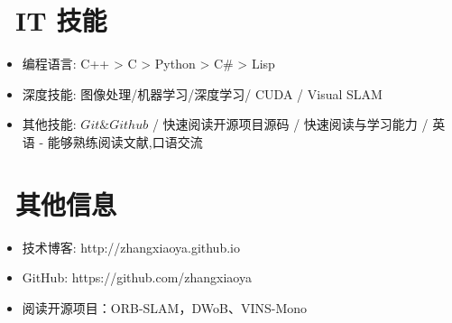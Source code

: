 \documentclass{resume}
\begin{document}

\section{\faCogs\ IT 技能}
\begin{itemize}[parsep=0.5ex]
  \item 编程语言: C++ > C > Python > C\# > Lisp
  \item 深度技能: 图像处理/机器学习/深度学习/ CUDA / Visual SLAM
  \item 其他技能: $Git\& Github$ / 快速阅读开源项目源码  / 快速阅读与学习能力 / 英语 - 能够熟练阅读文献,口语交流
\end{itemize}

\section{\faInfo\ 其他信息}
\begin{itemize}[parsep=0.5ex]
  \item 技术博客: http://zhangxiaoya.github.io
  \item GitHub: https://github.com/zhangxiaoya
  \item 阅读开源项目：ORB-SLAM，DWoB、VINS-Mono
\end{itemize}
\end{document}
